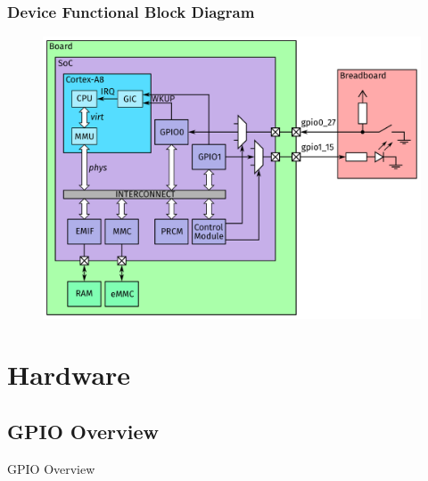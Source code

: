 \documentclass[aspectratio=169,usenames,dvipsnames]{beamer}
\begin{document}
\begin{frame}
  \frametitle{Device Functional Block Diagram}
  \vspace*{-5mm}
  \begin{figure}
    \centering
    \includegraphics[scale=0.22]{images/architecture2.pdf}
  \end{figure}
  \vspace*{-12mm}
\end{frame}

\section{Hardware}

\subsection{GPIO Overview}

\begin{frame}[standout]
  GPIO Overview
\end{frame}
\end{document}
